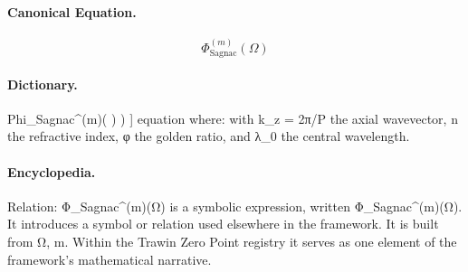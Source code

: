 \paragraph{Canonical Equation.}
\[
\Phi_{\text{Sagnac}}^{(m)}(\Omega)
\]

\paragraph{Dictionary.}
Phi\_Sagnac\textasciicircum{}(m)( ) ) ] equation where: with k\_z = 2π/P the axial wavevector, n the refractive index, φ the golden ratio, and λ\_0 the central wavelength.

\paragraph{Encyclopedia.}
Relation: Φ\_Sagnac\textasciicircum{}(m)(Ω) is a symbolic expression, written Φ\_Sagnac\textasciicircum{}(m)(Ω). It introduces a symbol or relation used elsewhere in the framework. It is built from Ω, m. Within the Trawin Zero Point registry it serves as one element of the framework's mathematical narrative.
